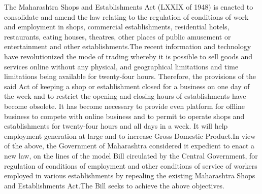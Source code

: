 \documentclass[gaz8,ordinance]{mhact}
\begin{document}
\begin{sor}
\begin{sorlist}
          \item
          The Maharashtra Shops and Establishments Act (LXXIX of 1948) is 
enacted to consolidate and amend the law relating to the regulation of 
conditions of work and employment in shops, commercial establishments, 
residential hotels, restaurants, eating houses, theatres, other places of public 
amusement or entertainment and other establishments.The recent information and technology have revolutionized the mode 
of trading whereby it is possible to sell goods and services online without 
any physical, and geographical limitations and time limitations being available 
for twenty-four hours. Therefore, the provisions of the said Act of keeping a 
shop or establishment closed for a business on one day of the week and to 
restrict the opening and closing hours of establishments have become obsolete. 
It has become necessary to provide even platform for offline business to 
compete with online business and to permit to operate shops and 
establishments for twenty-four hours and all days in a week. It will help 
employment generation at large and to increase Gross Domestic Product.In view of the above, the Government of Maharashtra considered it 
expedient to enact a new law, on the lines of the model Bill circulated by the 
Central Government, for regulation of conditions of employment and other 
conditions of service of workers employed in various establishments by 
repealing the existing Maharashtra Shops and Establishments Act.The Bill seeks to achieve the above objectives.
\end{sorlist}

\end{sor}
\end{document}
